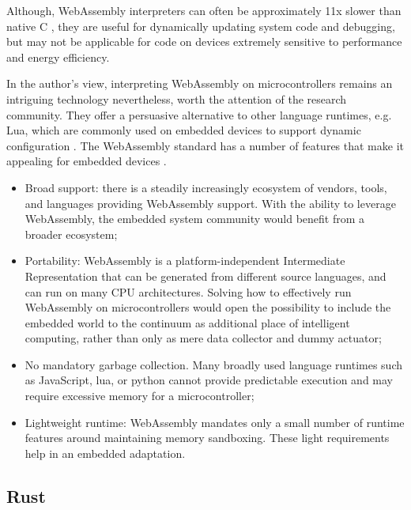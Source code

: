 Although, WebAssembly interpreters can often be approximately 11x slower than native C \cite{wasm3-performance}, they are useful for dynamically updating system code and debugging, but may not be applicable for code on devices extremely sensitive to performance and energy efficiency.

In the author's view, interpreting WebAssembly on microcontrollers remains an intriguing technology nevertheless, worth the attention of the research community. They offer a persuasive alternative to other language runtimes, e.g. Lua, which are commonly used on embedded devices to support dynamic configuration \cite{levee}. The WebAssembly standard has a number of features that make it appealing for embedded devices \cite{ewasm}.

\begin{itemize}
    \item Broad support: there is a steadily increasingly ecosystem of vendors, tools, and languages providing WebAssembly support. With the ability to leverage WebAssembly, the embedded system community would benefit from a broader ecosystem;
    \item Portability: WebAssembly is a platform-independent Intermediate Representation that can be generated from different source languages, and can run on many CPU architectures. Solving how to effectively run WebAssembly on microcontrollers would open the possibility to include the embedded world to the continuum as additional place of intelligent computing, rather than only as mere data collector and dummy actuator;
    \item No mandatory garbage collection. Many broadly used language runtimes such as JavaScript, lua, or python cannot provide predictable execution and may require excessive memory for a microcontroller;
    \item Lightweight runtime: WebAssembly mandates only a small number of runtime features around maintaining memory sandboxing. These light requirements help in an embedded adaptation.
\end{itemize}

\subsection{Rust}
\label{sec:rust}


